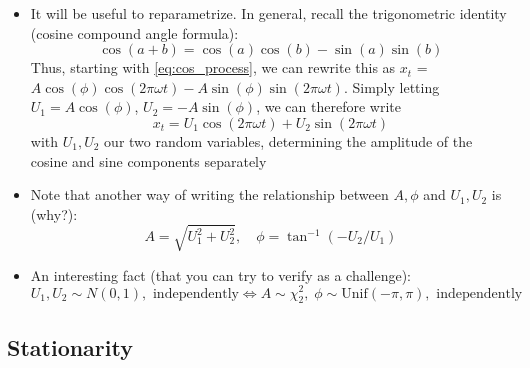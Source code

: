 \documentclass{article}
\begin{document}
\begin{itemize}
\item It will be useful to reparametrize. In general, recall the trigonometric
  identity (cosine compound angle formula):
  \begin{equation}
  \label{eq:compound_angle}
  \cos(a + b) = \cos(a) \cos(b) - \sin(a) \sin(b)
  \end{equation}
  Thus, starting with \eqref{eq:cos_process}, we can rewrite this as $x_t$ = $A
  \cos(\phi) \cos(2\pi\omega t) - A \sin(\phi) \sin(2\pi\omega t)$. Simply
  letting $U_1 = A \cos(\phi)$, $U_2 = -A \sin(\phi)$, we can therefore write   
  \begin{equation}
  \label{eq:cos_sin_process}
  x_t = U_1 \cos(2\pi\omega t) + U_2 \sin(2\pi\omega t)
  \end{equation}
  with $U_1, U_2$ our two random variables, determining the amplitude of the
  cosine and sine components separately

\item Note that another way of writing the relationship between $A,\phi$ and
  $U_1,U_2$ is (why?):
  \[
  A = \sqrt{U_1^2 + U_2^2}, \quad \phi = \tan^{-1}(-U_2/U_1)
  \]

  \item An interesting fact (that you can try to verify as a challenge): 
  \[
  U_1,U_2 \sim N(0,1), \text{ independently} \iff 
  A \sim \chi^2_2, \; \phi \sim \mathrm{Unif}(-\pi,\pi), \text{ independently} 
  \]
\end{itemize}

\subsection{Stationarity}
\end{document}
